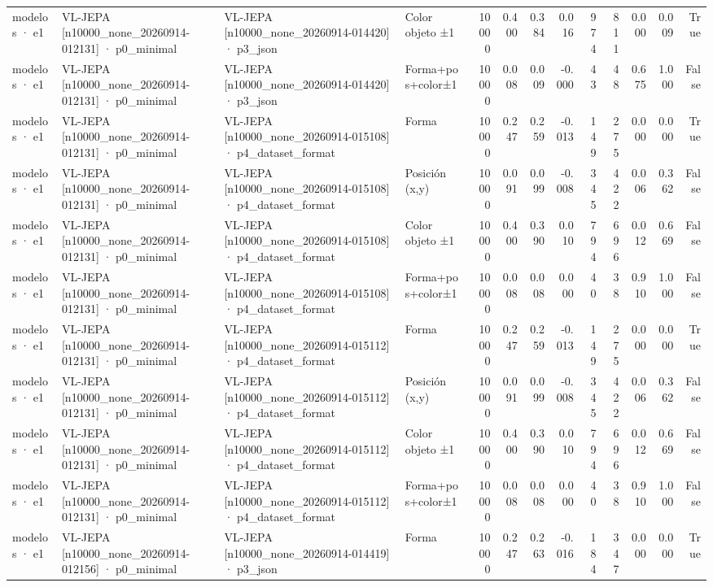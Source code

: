 \begin{tabular}{llllrrrrrrrrr}
modelos · e1 & VL-JEPA [n10000\_none\_20260914-012131] · p0\_minimal & VL-JEPA [n10000\_none\_20260914-014420] · p3\_json & Color objeto ±1 & 10000 & 0.400 & 0.384 & 0.016 & 974 & 811 & 0.000 & 0.009 & True \\
modelos · e1 & VL-JEPA [n10000\_none\_20260914-012131] · p0\_minimal & VL-JEPA [n10000\_none\_20260914-014420] · p3\_json & Forma+pos+color±1 & 10000 & 0.008 & 0.009 & -0.000 & 43 & 48 & 0.675 & 1.000 & False \\
modelos · e1 & VL-JEPA [n10000\_none\_20260914-012131] · p0\_minimal & VL-JEPA [n10000\_none\_20260914-015108] · p4\_dataset\_format & Forma & 10000 & 0.247 & 0.259 & -0.013 & 149 & 275 & 0.000 & 0.000 & True \\
modelos · e1 & VL-JEPA [n10000\_none\_20260914-012131] · p0\_minimal & VL-JEPA [n10000\_none\_20260914-015108] · p4\_dataset\_format & Posición (x,y) & 10000 & 0.091 & 0.099 & -0.008 & 345 & 422 & 0.006 & 0.362 & False \\
modelos · e1 & VL-JEPA [n10000\_none\_20260914-012131] · p0\_minimal & VL-JEPA [n10000\_none\_20260914-015108] · p4\_dataset\_format & Color objeto ±1 & 10000 & 0.400 & 0.390 & 0.010 & 794 & 696 & 0.012 & 0.669 & False \\
modelos · e1 & VL-JEPA [n10000\_none\_20260914-012131] · p0\_minimal & VL-JEPA [n10000\_none\_20260914-015108] · p4\_dataset\_format & Forma+pos+color±1 & 10000 & 0.008 & 0.008 & 0.000 & 40 & 38 & 0.910 & 1.000 & False \\
modelos · e1 & VL-JEPA [n10000\_none\_20260914-012131] · p0\_minimal & VL-JEPA [n10000\_none\_20260914-015112] · p4\_dataset\_format & Forma & 10000 & 0.247 & 0.259 & -0.013 & 149 & 275 & 0.000 & 0.000 & True \\
modelos · e1 & VL-JEPA [n10000\_none\_20260914-012131] · p0\_minimal & VL-JEPA [n10000\_none\_20260914-015112] · p4\_dataset\_format & Posición (x,y) & 10000 & 0.091 & 0.099 & -0.008 & 345 & 422 & 0.006 & 0.362 & False \\
modelos · e1 & VL-JEPA [n10000\_none\_20260914-012131] · p0\_minimal & VL-JEPA [n10000\_none\_20260914-015112] · p4\_dataset\_format & Color objeto ±1 & 10000 & 0.400 & 0.390 & 0.010 & 794 & 696 & 0.012 & 0.669 & False \\
modelos · e1 & VL-JEPA [n10000\_none\_20260914-012131] · p0\_minimal & VL-JEPA [n10000\_none\_20260914-015112] · p4\_dataset\_format & Forma+pos+color±1 & 10000 & 0.008 & 0.008 & 0.000 & 40 & 38 & 0.910 & 1.000 & False \\
modelos · e1 & VL-JEPA [n10000\_none\_20260914-012156] · p0\_minimal & VL-JEPA [n10000\_none\_20260914-014419] · p3\_json & Forma & 10000 & 0.247 & 0.263 & -0.016 & 184 & 347 & 0.000 & 0.000 & True \\

\end{tabular}
